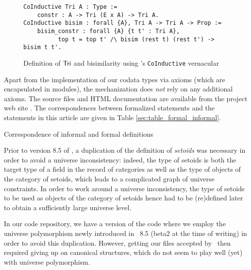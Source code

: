 \documentclass[a4paper,USenglish]{lipics}
\newcommand{\parencite}[1]{\cite{#1}}
\begin{document}
\begin{figure}
  \begin{lstlisting}
CoInductive Tri A : Type :=
    constr : A -> Tri (E x A) -> Tri A.
CoInductive bisim : forall {A}, Tri A -> Tri A -> Prop :=
    bisim_constr : forall {A} {t t' : Tri A}, 
          top t = top t' /\ bisim (rest t) (rest t') -> bisim t t'.
\end{lstlisting}
 \caption{Definition of $\mathsf{Tri}$ and bisimilarity using \coq's \lstinline!CoInductive! vernacular} \label{tri_coinductive}
\end{figure}


Apart from the implementation of our codata types via axioms (which are encapsulated in modules), the mechanization does \emph{not} rely on any additional axioms.
The \coq source files and HTML documentation are available from the project web site \parencite{trimat_coq}.
The correspondences between formalized statements and the statements in this article are given in Table \ref{sec:table_formal_informal}.



\begin{table}[hbt]
 \begin{mdframed}
  
 \end{mdframed}
 \caption{Correspondence of informal and formal definitions} \label{sec:table_formal_informal}
\end{table}


 Prior to version 8.5 of \coq, a duplication of the definition of \emph{setoids} was necessary in order to avoid a universe inconsistency: indeed, 
 the type of setoids is both the target type of a field in the record of categories as well as the type of objects of the category of setoids,
 which leads to a complicated graph of universe constraints. In order to work around a universe inconsistency, the type of setoids to be used as objects of the category of 
 setoids hence had to be (re)defined later to obtain a sufficiently large universe level.
 
 In our code repository, we have a version of the code where we employ the universe polymorphism \cite{DBLP:conf/itp/SozeauT14} newly introduced in \coq~8.5 (beta2 at the time of writing)
 in order to avoid this duplication. However, getting our files accepted by \coq~then required giving up on canonical structures, which do not seem to play well (yet) with universe polymorphism.
\end{document}
